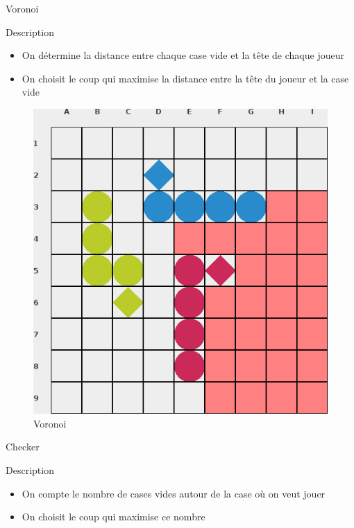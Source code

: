     \begin{frame}{Voronoi}
        \begin{block}{Description}
            \begin{itemize}
                \item On détermine la distance entre chaque case vide et la tête de chaque joueur
                \item On choisit le coup qui maximise la distance entre la tête du joueur et la case vide
            \end{itemize}
            \begin{figure}
                \begin{center}
                    \includegraphics[scale=0.25]{Images/Voronoi.png}
                    \caption{Voronoi}
                \end{center}
            \end{figure}
        \end{block}
    \end{frame}

    \begin{frame}{Checker}
        \begin{block}{Description}
            \begin{itemize}
                \item On compte le nombre de cases vides autour de la case où on veut jouer
                \item On choisit le coup qui maximise ce nombre
            \end{itemize}
        \end{block}
    \end{frame}

